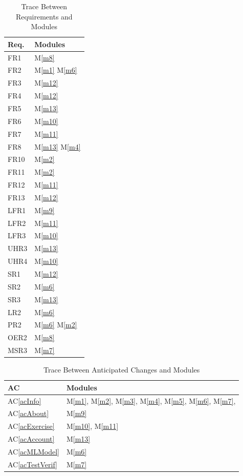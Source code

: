 \documentclass[12pt, titlepage]{article}
\newcommand{\acref}[1]{AC\ref{#1}}
\newcommand{\mref}[1]{M\ref{#1}}
\begin{document}
\begin{table}[H]
\centering
\begin{tabular}{p{} p{}}
\toprule
\textbf{Req.} & \textbf{Modules}\\
\midrule
FR1 & \mref{m8}\\
FR2 & \mref{m1} \mref{m6}\\
FR3 & \mref{m12}\\
FR4 & \mref{m12}\\
FR5 & \mref{m13}\\
FR6 & \mref{m10}\\
FR7 & \mref{m11}\\
FR8 & \mref{m13} \mref{m4}\\
FR10 & \mref{m2}\\
FR11 & \mref{m2}\\
FR12 & \mref{m11}\\
FR13 & \mref{m12}\\
LFR1 & \mref{m9}\\
LFR2 & \mref{m11}\\
LFR3 & \mref{m10}\\
UHR3 & \mref{m13}\\
UHR4 & \mref{m10}\\
SR1 & \mref{m12}\\
SR2 & \mref{m6}\\
SR3 & \mref{m13}\\
LR2 & \mref{m6}\\
PR2 & \mref{m6} \mref{m2}\\
OER2 & \mref{m8}\\
MSR3 & \mref{m7}\\
\bottomrule
\end{tabular}
\caption{Trace Between Requirements and Modules}
\label{TblRT}
\end{table}

\begin{table}[H]
\centering
\begin{tabular}{p{} p{}}
\toprule
\textbf{AC} & \textbf{Modules}\\
\midrule
\acref{acInfo} & \mref{m1}, \mref{m2}, \mref{m3}, \mref{m4}, \mref{m5}, \mref{m6}, \mref{m7},\\
\acref{acAbout} & \mref{m9}\\
\acref{acExercise} & \mref{m10}, \mref{m11}\\
\acref{acAccount} & \mref{m13}\\
\acref{acMLModel} & \mref{m6}\\
\acref{acTestVerif} & \mref{m7}\\
\bottomrule
\end{tabular}
\caption{Trace Between Anticipated Changes and Modules}
\label{TblACT}
\end{table}
\end{document}
